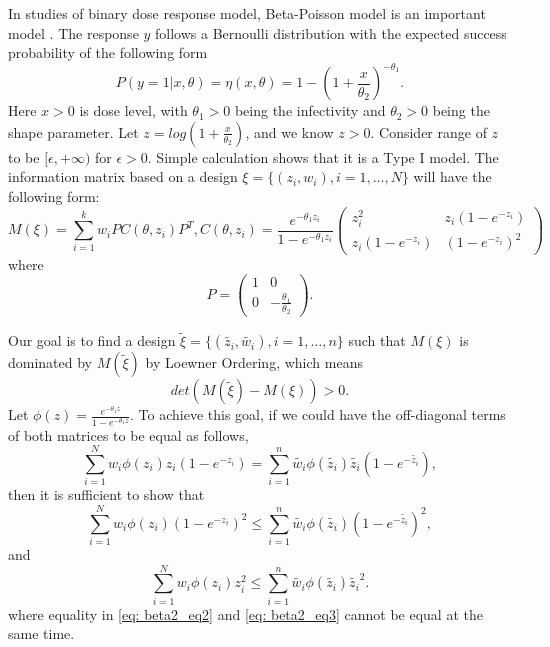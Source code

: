 \documentclass[11pt]{amsart}
\theoremstyle{definition}
\theoremstyle{remark}
\begin{document}
In  studies of binary dose response model, Beta-Poisson model is an important model \cite{haas1983}. The response $y$ follows a Bernoulli distribution with the expected success probability of the following form
\[
P(y=1|x,\theta) = \eta(x,\theta)= 1-(1+\frac{x}{\theta_2})^{-\theta_1}.
\]
 Here $x> 0$ is dose level, with $\theta_1>0$ being the infectivity and $\theta_2>0$ being the shape parameter. Let $z = log(1+\frac{x}{\theta_2})$, and we know $z>0$. Consider range of $z$ to be $[\epsilon,+\infty)$ for $\epsilon>0$. Simple calculation shows that it is a Type I model. The information matrix based on a design $\xi = \{(z_i,w_i), i=1,\ldots,N\}$ will have the following form: \begin{equation}
M(\xi) = \sum_{i=1}^{k} w_iP C(\theta,z_i)P^T,C(\theta,z_i) = \frac{e^{-\theta_1z_i}}{1-e^{-\theta_1z_i}}\left( \begin{array}{cc}
z_i^2 & z_i(1-e^{-z_i})\\
z_i(1-e^{-z_i}) & (1-e^{-z_i})^2
\end{array} \right) 
\end{equation} where \[P = \left( \begin{array}{cc}
1 & 0\\
0 & -\frac{\theta_1}{\theta_2}
\end{array} \right).\] 

Our goal is to find a design $\tilde{\xi} = \{(\tilde{z_i},\tilde{w_i}), i=1,\ldots,n\}$ such that $M(\xi)$ is dominated by $M(\tilde{\xi})$ by Loewner Ordering, which means \[det(M(\tilde{\xi})-M(\xi))>0.\] Let $\phi(z) = \frac{e^{-\theta_1z}}{1-e^{-\theta_1z}}$. To achieve this goal, if we could have the off-diagonal terms of both matrices to be equal as follows,
\begin{equation}\label{eq: beta2_eq1}
\sum_{i=1}^{N} w_i \phi(z_i)z_i(1-e^{-z_i}) = \sum_{i=1}^{n} \tilde{w_i}  \phi(\tilde{z_i}) \tilde{z_i}(1-e^{-\tilde{z_i}}),
\end{equation}
then it is sufficient to show that 
\begin{equation}\label{eq: beta2_eq2}
\sum_{i=1}^{N} w_i  \phi(z_i)(1-e^{-z_i})^2 \le \sum_{i=1}^{n} \tilde{w_i} \phi(\tilde{z_i}) (1-e^{-\tilde{z_i}})^2,
\end{equation}
and
\begin{equation}\label{eq: beta2_eq3}
\sum_{i=1}^{N} w_i \phi(z_i)z_i^2 \le \sum_{i=1}^{n} \tilde{w_i}\phi(\tilde{z_i})\tilde{z_i}^2.
\end{equation} where equality in \eqref{eq: beta2_eq2} and \eqref{eq: beta2_eq3} cannot be equal at the same time.\\
\end{document}
